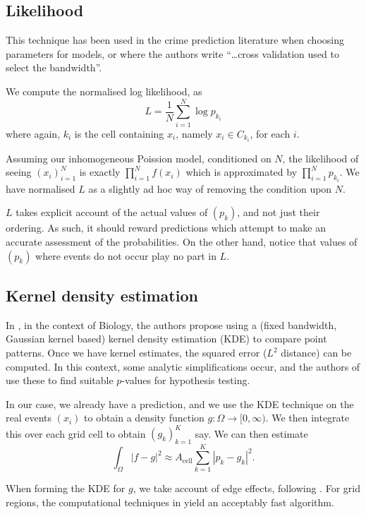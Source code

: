 \documentclass[twoside,a4paper,twocolumn,10pt]{article}
\theoremstyle{plain}
\theoremstyle{definition}
\begin{document}
\subsection{Likelihood}

This technique has been used in the crime prediction literature when choosing parameters
for models, \cite{rdbjc} or \cite[Section~5]{sepp} where the authors write
``\ldots cross validation used to select the bandwidth''.

We compute the normalised log likelihood, as
\[ L = \frac{1}{N} \sum_{i=1}^N \log p_{k_i} \]
where again, $k_i$ is the cell containing $x_i$, namely $x_i \in C_{k_i}$, for each $i$.

Assuming our inhomogeneous Poission model, conditioned on $N$, the likelihood of seeing
$(x_i)_{i=1}^N$ is exactly $\prod_{i=1}^N f(x_i)$ which is approximated by
$\prod_{i=1}^N p_{k_i}$.  We have normalised $L$ as a slightly ad hoc way of removing the
condition upon $N$.

$L$ takes explicit account of the actual values of $(p_k)$, and not just their
ordering.  As such, it should reward predictions which attempt to make an accurate
assessment of the probabilities.  On the other hand, notice that
values of $(p_k)$ where events do not occur play no part in $L$.


\subsection{Kernel density estimation}

In \cite{dgs}, in the context of Biology, the authors propose using a (fixed bandwidth,
Gaussian kernel based) kernel density estimation (KDE) to compare point patterns.  Once we 
have kernel estimates, the squared error ($L^2$ distance) can be computed.  In this
context, some analytic simplifications occur, and the authors of \cite{dgs} use these
to find suitable $p$-values for hypothesis testing.

In our case, we already have a prediction, and we use the KDE technique on the real
events $(x_i)$ to obtain a density function $g:\Omega\rightarrow [0,\infty)$.
We then integrate this over each grid cell to obtain $(g_k)_{k=1}^K$ say.  We can then
estimate
\[ \int_\Omega |f - g|^2 \approx A_{\text{cell}}\sum_{k=1}^K |p_k - g_k|^2. \]

When forming the KDE for $g$, we take account of edge effects, following \cite{kd}.
For grid regions, the computational techniques in \cite{kd} yield an acceptably
fast algorithm.
\end{document}

